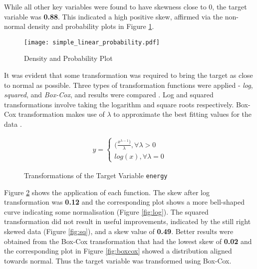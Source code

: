 While all other key variables were found to have skewness close to 0, the target variable was  \textbf{0.88}. This indicated a high positive skew, affirmed via the non-normal density and probability plots in Figure \ref{fig:sl_proba}.

\begin{figure}[ht!]
    \centering
    \texttt{[image: simple\_linear\_probability.pdf]}
    \caption{Density and Probability Plot}
    \label{fig:sl_proba}
\end{figure}

It was evident that some transformation was required to bring the target as close to normal as possible. Three types of transformation functions were applied - \textit{log}, \textit{squared}, and \textit{Box-Cox}, and results were compared \cite{osborne2002notes, ruppert1985data}. Log and squared transformations involve taking the logarithm and square roots respectively. Box-Cox transformation makes use of $\lambda$ to approximate the best fitting values for the data \cite{box1964analysis}.

\begin{equation}
    \begin{aligned}
        y =  \begin{cases}(\frac{x^{\lambda - 1})}{\lambda} ,  \forall  \lambda > 0  \\
              log(x),                   \forall  \lambda = 0
              \end{cases}
    \end{aligned}
\end{equation}


\begin{figure}[ht!]   
\centering
{}
\caption[]{Transformations of the Target Variable \texttt{energy}}
\label{fig:transformations}
\end{figure}

Figure \ref{fig:transformations} shows the application of each function. The skew after log transformation was \textbf{0.12} and the corresponding plot shows a more bell-shaped curve indicating some normalisation (Figure \ref{fig:log}). The squared transformation did not result in useful improvements, indicated by the still right skewed data (Figure \ref{fig:sq}), and a skew value of \textbf{0.49}. Better results were obtained from the Box-Cox transformation that had the lowest skew of \textbf{0.02} and the corresponding plot in Figure \ref{fig:boxcox} showed a distribution aligned towards normal. Thus the target variable was transformed using Box-Cox.

